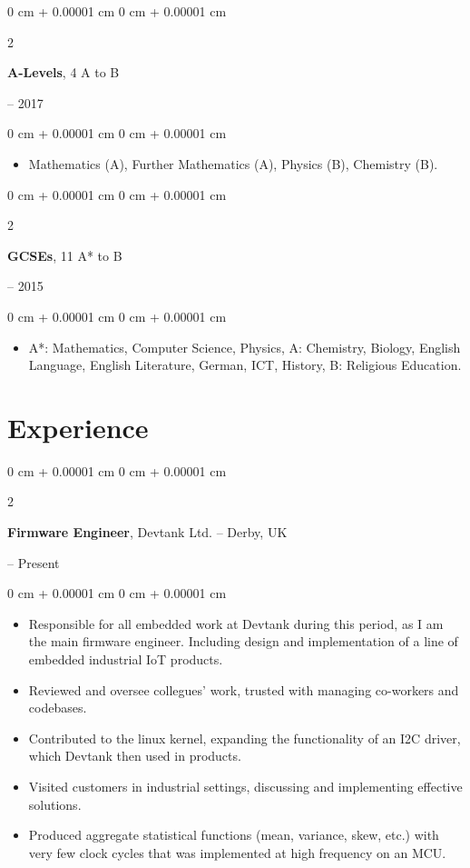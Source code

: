 \documentclass[10pt, letterpaper]{article}
\newenvironment{highlights}{
    \begin{itemize}[
        topsep=0.10 cm,
        parsep=0.10 cm,
        partopsep=0pt,
        itemsep=0pt,
        leftmargin=0 cm + 10pt
    ]
}{
    \end{itemize}
}
\newenvironment{onecolentry}{
    \begin{adjustwidth}{
        0 cm + 0.00001 cm
    }{
        0 cm + 0.00001 cm
    }
}{
    \end{adjustwidth}
}
\newenvironment{twocolentry}[2][]{
    \onecolentry
    \def\secondColumn{#2}
    \setcolumnwidth{\fill, 4.5 cm}
    \begin{paracol}{2}
}{
    \switchcolumn \raggedleft \secondColumn
    \end{paracol}
    \endonecolentry
}
\begin{document}
        \begin{twocolentry}{
            2015 – 2017
        }
            \textbf{A-Levels}, 4 A to B
        \end{twocolentry}

        \vspace{0.10 cm}
        \begin{onecolentry}
            \begin{highlights}
                \item Mathematics (A), Further Mathematics (A), Physics (B), Chemistry (B).
            \end{highlights}
        \end{onecolentry}

        \begin{twocolentry}{
            2010 – 2015
        }
            \textbf{GCSEs}, 11 A* to B
        \end{twocolentry}

        \vspace{0.10 cm}
        \begin{onecolentry}
            \begin{highlights}
                \item A*: Mathematics, Computer Science, Physics, A: Chemistry, Biology, English Language, English Literature, German, ICT, History, B: Religious Education.
            \end{highlights}
        \end{onecolentry}

    \section{Experience}
        \begin{twocolentry}{
            2022 – Present
        }
            \textbf{Firmware Engineer}, Devtank Ltd. -- Derby, UK
        \end{twocolentry}

        \vspace{0.10 cm}
        \begin{onecolentry}
            \begin{highlights}
                \item Responsible for all embedded work at Devtank during this period, as I am the main firmware engineer. Including design and implementation of a line of embedded industrial IoT products.
                \item Reviewed and oversee collegues' work, trusted with managing co-workers and codebases.
                \item Contributed to the linux kernel, expanding the functionality of an I2C driver, which Devtank then used in products.
                \item Visited customers in industrial settings, discussing and implementing effective solutions.
                \item Produced aggregate statistical functions (mean, variance, skew, etc.) with very few clock cycles that was implemented at high frequency on an MCU.
            \end{highlights}
        \end{onecolentry}
\end{document}
